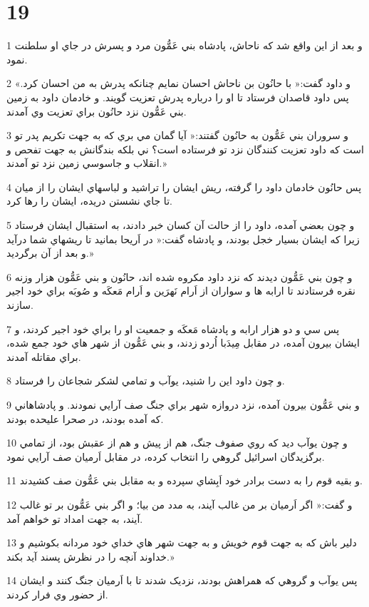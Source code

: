 \chapter{19}

\par 1 و بعد از اين واقع شد که ناحاش، پادشاه بني عَمُّون مرد و پسرش در جاي او سلطنت نمود.
\par 2 و داود گفت:« با حانُون بن ناحاش احسان نمايم چنانکه پدرش به من احسان کرد.» پس داود قاصدان فرستاد تا او را درباره پدرش تعزيت گويند. و خادمان داود به زمين بني عَمُّون نزد حانُون براي تعزيت وي آمدند.
\par 3 و سروران بني عَمُّون به حانُون گفتند:« آيا گمان مي بري که به جهت تکريم پدر تو است که داود تعزيت کنندگان نزد تو فرستاده است؟ ني بلکه بندگانش به جهت تفحص و انقلاب و جاسوسي زمين نزد تو آمدند.»
\par 4 پس حانُون خادمان داود را گرفته، ريش ايشان را تراشيد و لباسهاي ايشان را از ميان تا جاي نشستن دريده، ايشان را رها کرد.
\par 5 و چون بعضي آمده، داود را از حالت آن کسان خبر دادند، به استقبال ايشان فرستاد زيرا که ايشان بسيار خجل بودند، و پادشاه گفت:« در اَريحا بمانيد تا ريشهاي شما درآيد و بعد از آن برگرديد.»
\par 6 و چون بني عَمُّون ديدند که نزد داود مکروه شده اند، حانُون و بني عَمُّون هزار وزنه نقره فرستادند تا ارابه ها و سواران از اَرام نَهرَين و اَرام مَعکَه و صُوبَه براي خود اجير سازند.
\par 7 پس سي و دو هزار ارابه و پادشاه مَعکَه و جمعيت او را براي خود اجير کردند، و ايشان بيرون آمده، در مقابل مِيدَبا اُردو زدند، و بني عَمُّون از شهر هاي خود جمع شده، براي مقاتله آمدند.
\par 8 و چون داود اين را شنيد، يوآب و تمامي لشکر شجاعان را فرستاد.
\par 9 و بني عَمُّون بيرون آمده، نزد دروازه شهر براي جنگ صف آرايي نمودند. و پادشاهاني که آمده بودند، در صحرا عليحده بودند.
\par 10 و چون يوآب ديد که روي صفوف جنگ، هم از پيش و هم از عقبش بود، از تمامي برگزيدگان اسرائيل گروهي را انتخاب کرده، در مقابل اَرميان صف آرايي نمود.
\par 11 و بقيه قوم را به دست برادر خود اَبِشاي سپرده و به مقابل بني عَمُّون صف کشيدند.
\par 12 و گفت:« اگر اَرميان بر من غالب آيند، به مدد من بيا؛ و اگر بني عَمُّون بر تو غالب آيند، به جهت امداد تو خواهم آمد.
\par 13 دلير باش که به جهت قوم خويش و به جهت شهر هاي خداي خود مردانه بکوشيم و خداوند آنچه را در نظرش پسند آيد بکند.»
\par 14 پس يوآب و گروهي که همراهش بودند، نزديک شدند تا با اَرميان جنگ کنند و ايشان از حضور وي فرار کردند.
